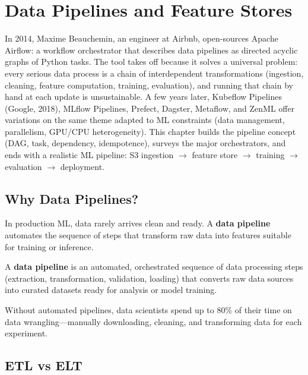 \chapter{Data Pipelines and Feature Stores}
\label{ch:pipelines}

In 2014, Maxime Beauchemin, an engineer at Airbnb, open-sources Apache Airflow: a workflow orchestrator that describes data pipelines as directed acyclic graphs of Python tasks. The tool takes off because it solves a universal problem: every serious data process is a chain of interdependent transformations (ingestion, cleaning, feature computation, training, evaluation), and running that chain by hand at each update is unsustainable. A few years later, Kubeflow Pipelines (Google, 2018), MLflow Pipelines, Prefect, Dagster, Metaflow, and ZenML offer variations on the same theme adapted to ML constraints (data management, parallelism, GPU/CPU heterogeneity). This chapter builds the pipeline concept (DAG, task, dependency, idempotence), surveys the major orchestrators, and ends with a realistic ML pipeline: S3 ingestion $\to$ feature store $\to$ training $\to$ evaluation $\to$ deployment.

\section{Why Data Pipelines?}
\label{sec:why-pipelines}

In production ML, data rarely arrives clean and ready. A \textbf{data
pipeline} automates the sequence of steps that transform raw data into
features suitable for training or inference.

\begin{definition}
A \textbf{data pipeline} is an automated,
orchestrated sequence of data processing steps (extraction, transformation,
validation, loading) that converts raw data sources into curated datasets
ready for analysis or model training.
\end{definition}

\begin{remark}
Without automated pipelines, data scientists spend up to 80\% of their
time on data wrangling---manually downloading, cleaning, and
transforming data for each experiment.
\end{remark}

\section{ETL vs ELT}
\label{sec:etl-elt}

